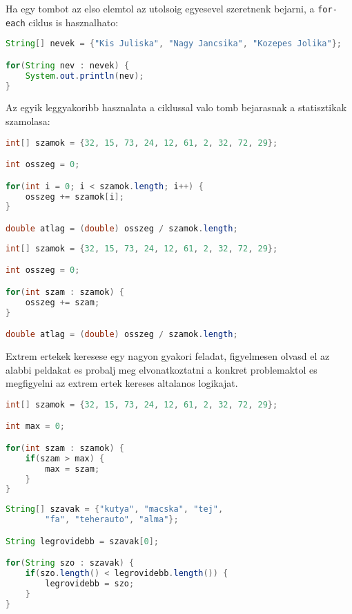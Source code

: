 \documentclass{article}
\begin{document}
Ha egy tombot az elso elemtol az utolsoig egyesevel szeretnenk bejarni, a \lstinline{for-each} ciklus is hasznalhato:
\begin{lstlisting}[language=Java, caption=Tomb elemeinek megjelenitese for-each ciklussal]
String[] nevek = {"Kis Juliska", "Nagy Jancsika", "Kozepes Jolika"};

for(String nev : nevek) {
    System.out.println(nev);
}
\end{lstlisting}


Az egyik leggyakoribb hasznalata a ciklussal valo tomb bejarasnak a statisztikak szamolasa:
\begin{lstlisting}[language=Java, caption=Atlagszamolas for ciklussal]
int[] szamok = {32, 15, 73, 24, 12, 61, 2, 32, 72, 29};

int osszeg = 0;

for(int i = 0; i < szamok.length; i++) {
    osszeg += szamok[i];
}

double atlag = (double) osszeg / szamok.length;
\end{lstlisting}

\newpage

\begin{lstlisting}[language=Java, caption=Atlagszamolas for-each ciklussal]
int[] szamok = {32, 15, 73, 24, 12, 61, 2, 32, 72, 29};

int osszeg = 0;

for(int szam : szamok) {
    osszeg += szam;
}

double atlag = (double) osszeg / szamok.length;
\end{lstlisting}

Extrem ertekek keresese egy nagyon gyakori feladat, figyelmesen olvasd el az alabbi peldakat es probalj meg elvonatkoztatni a konkret problemaktol es megfigyelni az extrem ertek kereses altalanos logikajat.

\begin{lstlisting}[language=Java, caption=Maximum ertek kereses]
int[] szamok = {32, 15, 73, 24, 12, 61, 2, 32, 72, 29};

int max = 0;

for(int szam : szamok) {
    if(szam > max) {
        max = szam;
    }
}
\end{lstlisting}

\begin{lstlisting}[language=Java, caption=Legrovidebb String kereses]
String[] szavak = {"kutya", "macska", "tej",
        "fa", "teherauto", "alma"};

String legrovidebb = szavak[0];

for(String szo : szavak) {
    if(szo.length() < legrovidebb.length()) {
        legrovidebb = szo;
    }
}
\end{lstlisting}
\end{document}
